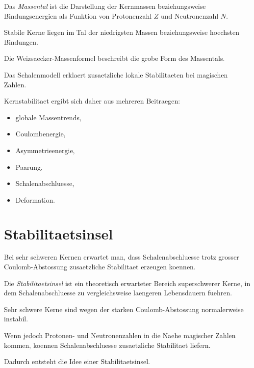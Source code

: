 \begin{definitionbox}
Das \emph{Massental} ist die Darstellung der Kernmassen beziehungsweise
Bindungsenergien als Funktion von Protonenzahl $Z$ und Neutronenzahl $N$.

Stabile Kerne liegen im Tal der niedrigsten Massen beziehungsweise hoechsten Bindungen.
\end{definitionbox}

\begin{conceptbox}
Die Weizsaecker-Massenformel beschreibt die grobe Form des Massentals.

Das Schalenmodell erklaert zusaetzliche lokale Stabilitaeten bei magischen Zahlen.
\end{conceptbox}

\begin{notebox}
Kernstabilitaet ergibt sich daher aus mehreren Beitraegen:
\begin{itemize}
    \item globale Massentrends,
    \item Coulombenergie,
    \item Asymmetrieenergie,
    \item Paarung,
    \item Schalenabschluesse,
    \item Deformation.
\end{itemize}
\end{notebox}

\section{Stabilitaetsinsel}

Bei sehr schweren Kernen erwartet man, dass Schalenabschluesse trotz grosser
Coulomb-Abstossung zusaetzliche Stabilitaet erzeugen koennen.

\begin{definitionbox}
Die \emph{Stabilitaetsinsel} ist ein theoretisch erwarteter Bereich superschwerer
Kerne, in dem Schalenabschluesse zu vergleichsweise laengeren Lebensdauern fuehren.
\end{definitionbox}

\begin{conceptbox}
Sehr schwere Kerne sind wegen der starken Coulomb-Abstossung normalerweise instabil.

Wenn jedoch Protonen- und Neutronenzahlen in die Naehe magischer Zahlen kommen,
koennen Schalenabschluesse zusaetzliche Stabilitaet liefern.

Dadurch entsteht die Idee einer Stabilitaetsinsel.
\end{conceptbox}

